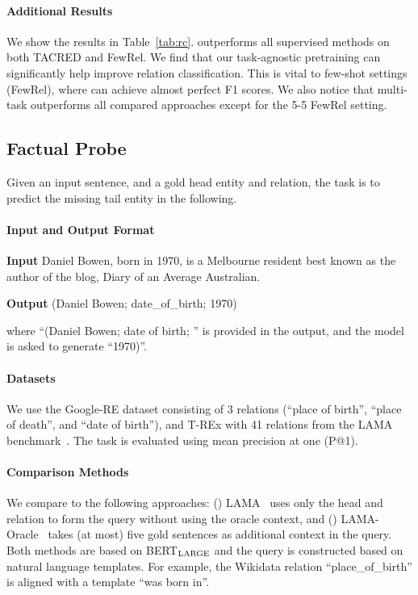 \paragraph{Additional Results}
We show the results in Table~\ref{tab:rc}. \method outperforms all supervised methods on both TACRED and FewRel. We find that our task-agnostic pretraining can significantly help improve relation classification. This is vital to few-shot settings (FewRel), where \method can achieve almost perfect F1 scores. We also notice that multi-task \method outperforms all compared approaches except for the 5-5 FewRel setting.

\subsection{Factual Probe}
Given an input sentence, and a gold head entity and relation, the task is to predict the missing tail entity in the following.
\paragraph{Input and Output Format}
\begin{enumerate*}
    \item[] {\bf Input} Daniel Bowen, born in 1970, is a Melbourne resident best known as the author of the blog, Diary of an Average Australian.
    \item[] {\bf Output} (Daniel Bowen; date\_of\_birth; 1970)
\end{enumerate*}

\noindent where ``(Daniel Bowen; date of birth; '' is provided in the output, and the model is asked to generate ``1970)''.

\paragraph{Datasets} We use the Google-RE dataset consisting of 3 relations (``place of birth'', ``place of death'', and ``date of birth''), and T-REx with 41 relations from the LAMA benchmark~\cite{petroni2019language}. The task is evaluated using mean precision at one (P@1).

\paragraph{Comparison Methods} We compare to the following approaches: (\expandafter{}) LAMA~\cite{petroni2019language} uses only the head and relation to form the query without using the oracle context, and (\expandafter{}) LAMA-Oracle~\cite{petroni2020context} takes (at most) five gold sentences as additional context in the query. Both methods are based on BERT$_{\rm{LARGE}}$ and the query is constructed based on natural language templates. For example, the Wikidata relation ``place\_of\_birth'' is aligned with a template ``was born in''.

